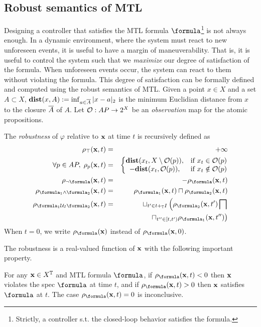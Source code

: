 \subsection{Robust semantics of MTL}
\label{sec:rob sem}
Designing a controller that satisfies the MTL formula $\formula$\footnote{Strictly, a controller s.t. the closed-loop behavior satisfies the formula.} is not always enough.
In a dynamic environment, where the system must react to new unforeseen events, it is useful to have a margin of maneuverability.
That is, it is useful to control the system such that we \textit{maximize} our degree of satisfaction of the formula.
When unforeseen events occur, the system can react to them without violating the formula.
This degree of satisfaction can be formally defined and computed using the robust semantics of MTL.
Given a point $x \in X$ and a set $A \subset X$, $\mathbf{dist}(x,A) := \inf_{a \in \overline{A}}|x-a|_2$ is the minimum Euclidian distance from $x$  to the closure $\overline{A}$ of $A$.
Let $\mathcal{O}: AP \rightarrow 2^X$ be an \textit{observation} map for the atomic propositions.
\begin{definition}
	\label{def:robustness estimate}
	The \emph{robustness} of $\varphi$ relative to $\mathbf{x}$ at time $t$ is recursively defined as 
	\begin{eqnarray*}
		\label{eq:robustness estimate}
		\rob_{\top} (\sstraj,t) &=& +\infty
		\\
		\forall p \in AP, \;  \rob_{p} (\sstraj,t) &=& \left \lbrace \begin{matrix}
			\dist(\stPt_t, \stSet \setminus \Oc(p)), &\text{if } \stPt_t \in \Oc(p)
			\\
			-\dist(x_t, \Oc(p)), &\text{if } \stPt_t \notin \Oc(p)						
		\end{matrix} \right.
		\\
		\rob_{\lnot \formula} (\sstraj,t) &=& - \rob_{\formula} (\sstraj,t)
		\\
		\rob_{ \formula_1 \land \formula_2} (\sstraj,t) &=& \rob_{\formula_1} (\sstraj,t) \sqcap \rob_{\formula_2} (\sstraj,t) 
		\\
		\rob_{ \formula_1 \until_I \formula_2} (\sstraj,t) &=& \sqcup_{t' \in t+_{\TDom}I} \left(\rob_{\formula_2} (\sstraj,t') \bigsqcap \right.
		\\
		&& \left. \sqcap_{t'' \in [t,t')}   \rob_{\formula_1} (\sstraj,t'') \right) 
	\end{eqnarray*}
	When $t=0$, we write $\robf(\sstraj)$ instead of $\robf(\sstraj,0)$.
\end{definition}
The robustness is a real-valued function of $\mathbf{x}$ with the following important property.
\begin{theorem} \cite{FainekosP09tcs}
	\label{thm:rob objective}
	For any $\mathbf{x} \in X^{\mathbb{T}}$ and MTL formula $\formula$, 
	if $\robf(\sstraj,t) <0$ then $\mathbf{x}$ violates the spec $\formula$ at time $t$, and if $\robf(\sstraj,t) > 0$ then $\mathbf{x}$ satisfies $\formula$ at $t$. 
	The case $\robf(\sstraj,t) =0$ is inconclusive.
\end{theorem} 


